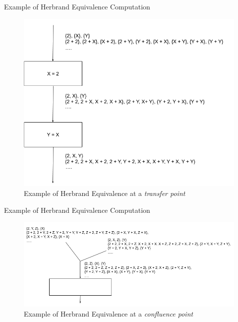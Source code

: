 \documentclass[11pt]{beamer}
\begin{document}
\begin{frame}{Example of Herbrand Equivalence Computation}
    \begin{figure}[!h]
        \centering
        \includegraphics[scale=0.3]{HerbrandEquivalenceTrans.png}
        \caption{Example of Herbrand Equivalence at a \textit{transfer point}}
        \label{fig:herbrandExample}
    \end{figure}
\end{frame}

\begin{frame}{Example of Herbrand Equivalence Computation}
    \begin{figure}[!h]
        \centering
        \includegraphics[scale=0.4]{HerbrandEquivalenceConv.png}
        \caption{Example of Herbrand Equivalence at a \textit{confluence point}}
        \label{fig:herbrandExample}
    \end{figure}
\end{frame}
\end{document}
